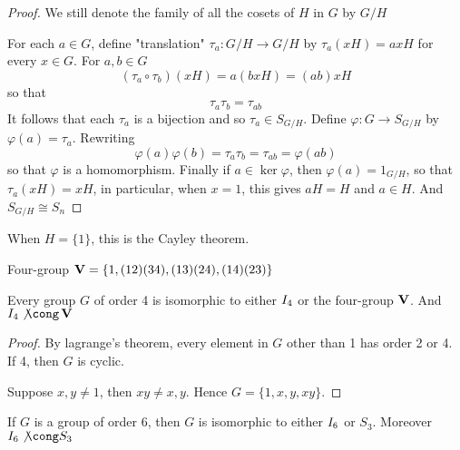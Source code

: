 \documentclass[11pt]{article}
\begin{document}
\begin{proof}
We still denote the family of all the cosets of \(H\) in \(G\) by \(G/H\)

For each \(a\in G\), define "translation" \(\tau_a:G/H\to G/H\) by \(\tau_a(xH)=axH\)
for every \(x\in G\). For \(a,b\in G\)
\begin{equation*}
(\tau_a\circ\tau_b)(xH)=a(bxH)=(ab)xH
\end{equation*}
so that 
\begin{equation*}
\tau_a\tau_b=\tau_{ab}
\end{equation*}
It follows that each \(\tau_a\) is a bijection and so \(\tau_a\in S_{G/H}\). Define
\(\varphi:G\to S_{G/H}\) by \(\varphi(a)=\tau_a\). Rewriting
\begin{equation*}
\varphi(a)\varphi(b)=\tau_a\tau_b=\tau_{ab}=\varphi(ab)
\end{equation*}
so that \(\varphi\) is a homomorphism. Finally if \(a\in\ker\varphi\), then
\(\varphi(a)=1_{G/H}\), so that \(\tau_a(xH)=xH\), in particular, when \(x=1\), this
gives \(aH=H\) and \(a\in H\). And \(S_{G/H}\cong S_n\)
\end{proof}

When \(H=\{1\}\), this is the Cayley theorem.

Four-group \(\operatorname{\textbf{V}}=\{1,(1 2)(3 4),(1 3)(2 4), (1 4)(2 3)\}\)
\begin{proposition}[]
Every group \(G\) of order 4 is isomorphic to either \(\relax{I}_4\) or the four-group
\(\operatorname{\textbf{V}}\). And \(\I_4\not\cong\bV\)
\end{proposition}

\begin{proof}
By lagrange's theorem, every element in \(G\) other than 1 has order 2 or 4. If
4, then \(G\) is cyclic.

Suppose \(x,y\neq 1\), then \(xy\neq x,y\). Hence \(G=\{1,x,y,xy\}\).
\end{proof}


\begin{proposition}[]
If \(G\) is a group of order 6, then \(G\) is isomorphic to either \(\relax{I}_6\) or
\(S_3\). Moreover \(\I_6\not\cong S_3\)
\end{proposition}
\end{document}
